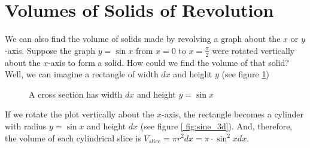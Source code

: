 \section{Volumes of Solids of Revolution}
We can also find the volume of solids made by revolving a graph about the $x$ 
or $y$-axis. Suppose the graph $y = \sin{x}$ from $x = 0$ to $x = \frac{\pi}{2
}$ were rotated vertically about the $x$-axis to form a solid. How could we 
find the volume of that solid? Well, we can imagine a rectangle of width $dx$ 
and height $y$ (see figure \ref{fig:sine_2d})

\begin{center}
\begin{figure}[htbp]
    \centering
    \caption{A cross section has width $dx$ and height $y = \sin{x}$}
    \label{fig:sine_2d}
\end{figure}
\end{center}

If we rotate the plot vertically about the $x$-axis, the rectangle becomes a 
cylinder with radius $y = \sin{x}$ and height $dx$ (see figure \ref{
fig:sine_3d}). And, therefore, the volume of each cylindrical slice is $V_{
slice} = \pi r^2 dx = \pi \cdot \sin^2{x} dx$. 

